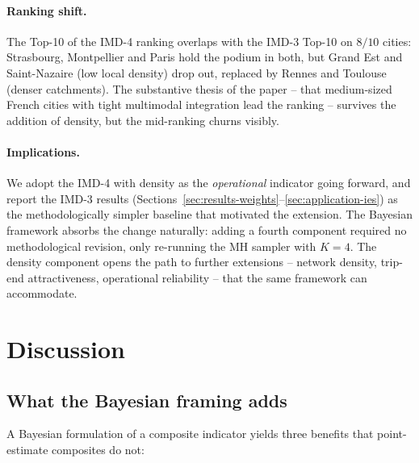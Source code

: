 \documentclass[11pt,a4paper]{article}
\begin{document}
\paragraph{Ranking shift.}
The Top-10 of the IMD-4 ranking overlaps with the IMD-3 Top-10
on $8/10$ cities: Strasbourg, Montpellier and Paris hold the
podium in both, but Grand Est and Saint-Nazaire (low local
density) drop out, replaced by Rennes and Toulouse (denser
catchments). The substantive thesis of the paper -- that
medium-sized French cities with tight multimodal integration
lead the ranking -- survives the addition of density, but the
mid-ranking churns visibly.

\paragraph{Implications.}
We adopt the IMD-4 with density as the \emph{operational}
indicator going forward, and report the IMD-3 results
(Sections~\ref{sec:results-weights}--\ref{sec:application-ies})
as the methodologically simpler baseline that motivated the
extension. The Bayesian framework absorbs the change naturally:
adding a fourth component required no methodological revision,
only re-running the MH sampler with $K = 4$. The density
component opens the path to further extensions -- network
density, trip-end attractiveness, operational reliability --
that the same framework can accommodate.

\section{Discussion}
\label{sec:discussion}

\subsection{What the Bayesian framing adds}

A Bayesian formulation of a composite indicator yields three
benefits that point-estimate composites do not:
\end{document}
